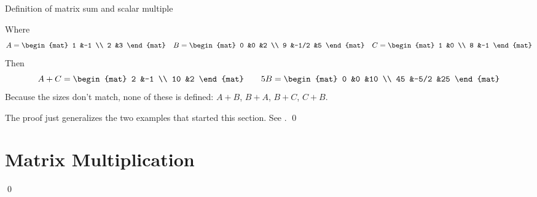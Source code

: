 \documentclass[10pt,t,serif,professionalfont]{beamer}
\begin{document}
\begin{frame}{Definition of matrix sum and scalar multiple}

\pause
\ex
Where
\begin{equation*}
  A=
  \begin{mat}
    1  &-1 \\
    2  &3
  \end{mat}
  \quad
  B=
  \begin{mat}
    0  &0     &2  \\
    9  &-1/2  &5
  \end{mat}
  \quad
  C=
  \begin{mat}
    1  &0 \\
    8  &-1
  \end{mat}
\end{equation*}
Then
\begin{equation*}
  A+C=
  \begin{mat}
    2  &-1  \\
    10 &2
  \end{mat}
  \qquad
  5B=
  \begin{mat}
    0  &0    &10 \\
    45 &-5/2 &25 
  \end{mat}
\end{equation*}
Because the sizes don't match, none of these is defined: $A+B$, $B+A$, 
$B+C$, $C+B$.

\end{frame}




\begin{frame}
\th[th:MatOpsRepMapOps]

\pause
\pf
The proof just generalizes the two examples that started this section.
See .
\qed

\end{frame}




\begin{frame}
\df[df:ZeroMatrix]
\end{frame}



\section{Matrix Multiplication}
\begin{frame}
\lm[lm:CompositionOfLinearMapsIsLinear]

\pause
\pf
{}
\qed
\end{frame}
\end{document}
